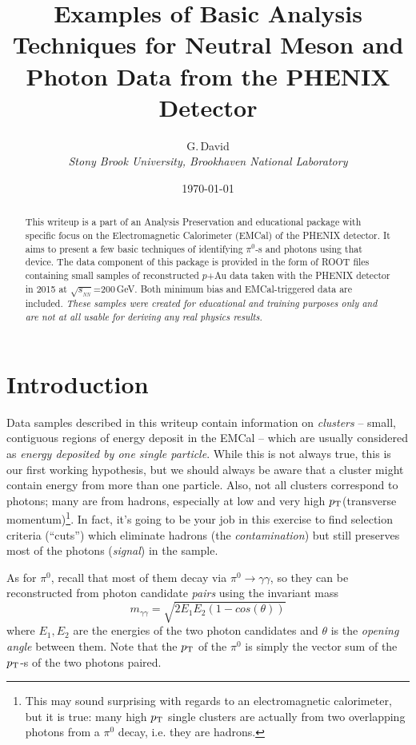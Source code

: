\documentclass[pdftex,12pt,letter]{article}
\title{Examples of Basic Analysis Techniques for Neutral Meson and Photon
Data from the PHENIX Detector}
\date{\today}
\author{G.\,David\\
{ \it Stony Brook University, Brookhaven National Laboratory}}
\newcommand{\sqsn}{\mbox{$\sqrt{s_{_{NN}}}$}\xspace}
\newcommand{\piz}{\mbox{$\pi^0$}\xspace}
\newcommand{\pt}{\mbox{$p_{\rm T}$}\xspace}
\begin{document}
\maketitle

\begin{abstract}
\noindent  This writeup is a part of an Analysis Preservation and educational
 package with specific focus  on the Electromagnetic Calorimeter (EMCal)
of the PHENIX detector. It aims to present a few basic techniques
of identifying $\pi^0$-s and photons using that device.
The data component of this package is provided in the form of ROOT files
containing small samples of reconstructed $p$+Au data taken with the PHENIX detector
in 2015 at \sqsn=200\,GeV.  Both minimum bias and EMCal-triggered data are included.
\textit{These samples were created for educational and training purposes only and are not at
all usable for deriving any real physics results.}
\end{abstract}


\section{Introduction}
Data samples described in this writeup contain
information on {\it clusters} -- small, contiguous regions of energy
deposit in the EMCal -- which are usually considered as 
{\it energy deposited by one single particle}.  While this is not
always true, this is our first working hypothesis, but we should
always be aware that a cluster might contain energy from more than one
particle.  Also, not all
clusters correspond to photons; many are from hadrons, especially at
low and very high \pt (transverse momentum)\footnote{
This may sound  surprising with regards to an electromagnetic calorimeter,
but it is true: many   high \pt single clusters are actually from two
overlapping photons  from a \piz decay, i.e. they are hadrons.}. 
In fact, it's going to be your job in this exercise to find selection criteria (``cuts'')
which eliminate hadrons (the {\it contamination}) but still preserves most of the
photons (\textit{signal}) in the sample.

As for \piz, recall that most of them decay via 
$\pi^0 \rightarrow \gamma\gamma$, so they can be reconstructed from
photon candidate {\it pairs} using the invariant mass
$$ m_{\gamma\gamma} = \sqrt{2E_1E_2(1-cos(\theta))} $$
where $E_1,E_2$ are the energies of the two photon candidates and
$\theta$ is the {\it opening angle} between them.  Note that the \pt
of the \piz is simply the vector sum of the \pt-s of the two photons
paired. 
\end{document}
